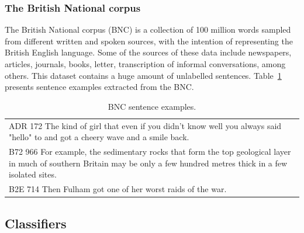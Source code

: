 \subsubsection*{The British National corpus}
The British National corpus (BNC) is a collection of 100 million words sampled from different written and spoken sources, with the intention of representing the British English language. Some of the sources of these data include newspapers, articles, journals, books, letter, transcription of informal conversations, among others. This dataset contains a huge amount of unlabelled sentences.
Table~\ref{tab:bnc_sent_example} presents sentence examples extracted from the BNC.

\begin{table}[h]
\centering
\begin{tabular}{p{}}
\hline
ADR 172 The kind of girl that even if you didn't know well you always said "hello" to and got a cheery wave and a smile back. \\
B72 966 For example, the sedimentary rocks that form the top geological layer in much of southern Britain may be only a few hundred metres thick in a few isolated sites. \\
B2E 714 Then Fulham got one of her worst raids of the war. \\
 \hline
\end{tabular}
\caption{BNC sentence examples.}
\label{tab:bnc_sent_example}
\end{table}

\subsection{Classifiers}
